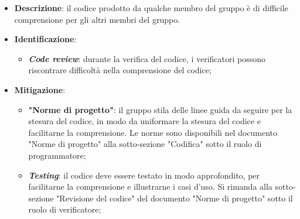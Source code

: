 \label{risk:codice incomprensibile}
\begin{itemize}
	\item \textbf{Descrizione}: il codice prodotto da qualche membro del gruppo
	      è di difficile comprensione per gli altri membri del gruppo.
	\item \textbf{Identificazione}:
	      \begin{itemize}
		      \item \textbf{\textit{Code review}}: durante la verifica del
		            codice, i verificatori possono riscontrare difficoltà nella
		            comprensione del codice;

	      \end{itemize}
	\item \textbf{Mitigazione}:
	      \begin{itemize}
		      \item \textbf{"Norme di progetto"}: il gruppo stila delle linee
		            guida da seguire per la stesura del codice, in modo da
		            uniformare la stesura del codice e facilitarne la
		            comprensione. Le norme sono disponibili nel documento
		            "Norme di progetto" alla sotto-sezione "Codifica" sotto il
		            ruolo di programmatore;

		      \item \textbf{\textit{Testing}}: il codice deve essere testato
		            in modo approfondito, per facilitarne la comprensione e
		            illustrarne i casi d'uso. Si rimanda alla sotto-sezione
		            "Revisione del codice" del documento "Norme di progetto"
		            sotto il ruolo di verificatore;
	      \end{itemize}
\end{itemize}
